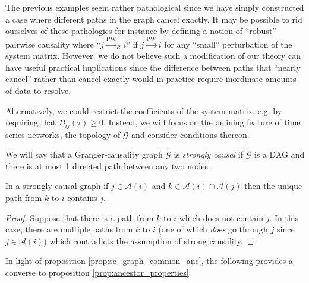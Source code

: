 \documentclass[12pt]{article}
\def\pwgc{\overset{\text{PW}}{\rightarrow}}  %
\def\gcg{\mathcal{G}}  %
\newcommand{\anc}[1]{\mathcal{A}(#1)}  %
\begin{document}
The previous examples seem rather pathological since we have simply
constructed a case where different paths in the graph cancel exactly.
It may be possible to rid ourselves of these pathologies for instance
by defining a notion of ``robust'' pairwise causality where
``$j \pwgc _R i$'' if $j \pwgc i$ for any ``small'' perturbation of
the system matrix.  However, we do not believe such a modification of
our theory can have useful practical implications since the difference
between paths that ``nearly cancel'' rather than cancel exactly would
in practice require inordinate amounts of data to resolve.

Alternatively, we could restrict the coefficients of the system
matrix, e.g. by requiring that $B_{ij}(\tau) \ge 0$.  Instead, we will
focus on the defining feature of time series networks, the topology of
$\gcg$ and consider conditions thereon.

\begin{definition}
  We will say that a Granger-causality graph $\gcg$ is \textit{strongly causal}
if $\gcg$ is a DAG and there is at most 1 directed path between any two nodes.
\end{definition}

\begin{proposition}
  \label{prop:sc_graph_common_anc}
  In a strongly causal graph if $j \in \anc{i}$ and $k \in \anc{i} \cap \anc{j}$ then the unique path from $k$ to $i$ contains $j$.
\end{proposition}
\begin{proof}
  Suppose that there is a path from $k$ to $i$ which does not contain $j$.  In this case, there are multiple paths from $k$ to $i$ (one of which \textit{does} go through $j$ since $j \in \anc{i}$) which contradicts the assumption of strong causality.
\end{proof}


In light of proposition \ref{prop:sc_graph_common_anc}, the following provides a converse to proposition \ref{prop:ancestor_properties}.
\end{document}
